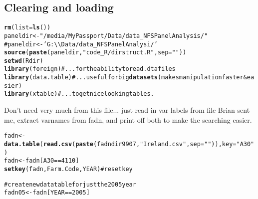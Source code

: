 \documentclass{article}\usepackage{graphicx, color}
\makeatletter
\newcommand{\hlfunctioncall}[1]{\textcolor[rgb]{0.501960784313725,0,0.329411764705882}{\textbf{#1}}}%
\newcommand{\hlstring}[1]{\textcolor[rgb]{0.6,0.6,1}{#1}}%
\newcommand{\hlcomment}[1]{\textcolor[rgb]{0.180392156862745,0.6,0.341176470588235}{#1}}%
\newenvironment{kframe}{%
 \def\at@end@of@kframe{}%
 \ifinner\ifhmode%
  \def\at@end@of@kframe{\end{minipage}}%
  \begin{minipage}{\columnwidth}%
 \fi\fi%
 \def\FrameCommand##1{\hskip\@totalleftmargin \hskip-\fboxsep
 \colorbox{shadecolor}{##1}\hskip-\fboxsep
     \hskip-\linewidth \hskip-\@totalleftmargin \hskip\columnwidth}%
 \MakeFramed {\advance\hsize-\width
   \@totalleftmargin\z@ \linewidth\hsize
   \@setminipage}}%
 {\par\unskip\endMakeFramed%
 \at@end@of@kframe}
\newenvironment{knitrout}{}{} %
\makeatother
\begin{document}
\begin{flushleft}
\subsection*{Clearing and loading}
\begin{knitrout}
\color{fgcolor}\begin{kframe}
\begin{alltt}
\hlfunctioncall{rm}(list = \hlfunctioncall{ls}())
paneldir <- \hlstring{"/media/MyPassport/Data/data_NFSPanelAnalysis/"}
\hlcomment{# paneldir <- 'G:\textbackslash{}\textbackslash{}Data/data_NFSPanelAnalysi/'}
\hlfunctioncall{source}(\hlfunctioncall{paste}(paneldir, \hlstring{"code_R/dirstruct.R"}, sep = \hlstring{""}))
\hlfunctioncall{setwd}(Rdir)
\hlfunctioncall{library}(foreign)  \hlcomment{#...for the ability to read .dta files}
\hlfunctioncall{library}(data.table)  \hlcomment{#... useful for big \hlfunctioncall{datasets} (makes manipulation faster & easier)}
\hlfunctioncall{library}(xtable)  \hlcomment{#... to get nice looking tables.}
\end{alltt}
\end{kframe}
\end{knitrout}

 
Don't need very much from this file... just read in var labels from file Brian sent me, extract varnames from fadn, and print off both to make the searching easier.

\begin{knitrout}
\color{fgcolor}\begin{kframe}
\begin{alltt}
fadn <- \hlfunctioncall{data.table}(\hlfunctioncall{read.csv}(\hlfunctioncall{paste}(fadndir9907, \hlstring{"Ireland.csv"}, sep = \hlstring{""})), key = \hlstring{"A30"})
fadn <- fadn[A30 == 4110]
\hlfunctioncall{setkey}(fadn, Farm.Code, YEAR)  \hlcomment{# reset key}
\end{alltt}
\end{kframe}
\end{knitrout}


\begin{knitrout}
\color{fgcolor}\begin{kframe}
\begin{alltt}
\hlcomment{# create new data table for just the 2005 year}
fadn05 <- fadn[YEAR == 2005]


\end{alltt}
\end{kframe}
\end{knitrout}
\end{flushleft}
\end{document}
